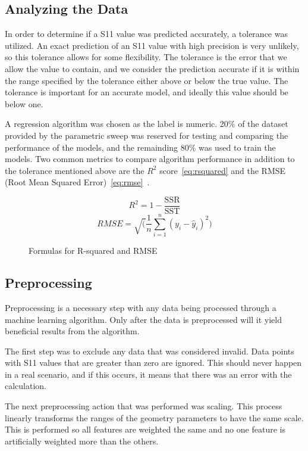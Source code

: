 \documentclass[lettersize,journal]{IEEEtran}
\begin{document}
\subsection{Analyzing the Data}
In order to determine if a S11 value was predicted accurately, a tolerance was utilized. An exact prediction of an S11 value with high precision is very unlikely, so this tolerance allows for some flexibility. The tolerance is the error that we allow the value to contain, and we consider the prediction accurate if it is within the range specified by the tolerance either above or below the true value. The tolerance is important for an accurate model, and ideally this value should be below one.

A regression algorithm was chosen as the label is numeric. 20\% of the dataset provided by the parametric sweep was reserved for testing and comparing the performance of the models, and the remainding 80\% was used to train the models. Two common metrics to compare algorithm performance in addition to the tolerance mentioned above are the $R^2$ score~\eqref{eq:rsquared} and the RMSE (Root Mean Squared Error)~\eqref{eq:rmse}~\cite{haque_machine_2023,m_el-kenawy_optimized_2022}. 

\begin{figure}[h]
    \begin{equation}
        R^2 = 1 - \frac{\text{SSR}}{\text{SST}}
        \label{eq:rsquared}
    \end{equation}
    \begin{equation}
        {RMSE} = \sqrt(\frac{1}{n} \sum_{i=1}^{n}(y_i - \hat{y}_i)^2)
        \label{eq:rmse}
    \end{equation}
    \caption{Formulas for R-squared and RMSE}
\end{figure}


\subsection{Preprocessing}
Preprocessing is a necessary step with any data being processed through a machine learning algorithm. Only after the data is preprocessed will it yield beneficial results from the algorithm.

The first step was to exclude any data that was considered invalid. Data points with S11 values that are greater than zero are ignored. This should never happen in a real scenario, and if this occurs, it means that there was an error with the calculation. 

The next preprocessing action that was performed was scaling. This process linearly transforms the ranges of the geometry parameters to have the same scale. This is performed so all features are weighted the same and no one feature is artificially weighted more than the others.
\end{document}
